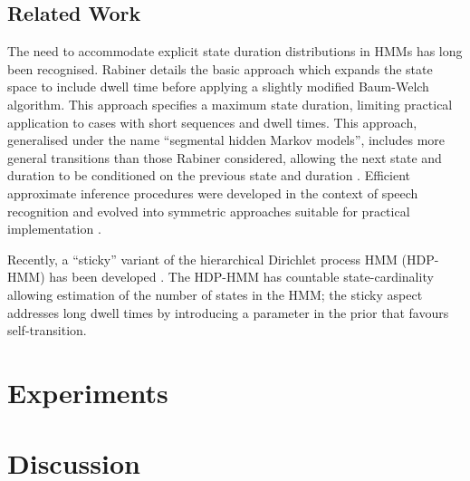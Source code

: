 \documentclass[journal]{../inc/oldtran/IEEEtran}
\begin{document}
\subsection{Related Work}

The need to accommodate explicit state duration distributions in HMMs has long been recognised. Rabiner \cite{Rabiner89} details the basic approach which expands the state space to include dwell time before applying a slightly modified Baum-Welch algorithm. This approach specifies a maximum state duration, limiting practical application 
to cases with short sequences and dwell times.
This approach, generalised under the name ``segmental hidden Markov models'', includes more general transitions than those Rabiner considered, allowing the next state and duration to be conditioned on the previous state and duration \cite{Gales93}. Efficient approximate inference procedures were developed in the context of speech recognition \cite{Ostendorf96} and evolved into symmetric approaches suitable for practical implementation \cite{Yu2006}.

Recently, a ``sticky'' variant of the hierarchical Dirichlet process HMM (HDP-HMM) has been developed \cite{Fox2008}.  The HDP-HMM has countable state-cardinality \cite{Teh06} allowing estimation of the number of states in the HMM; the sticky aspect addresses long dwell times by introducing a parameter in the prior that favours self-transition. 


\section{Experiments}

\label{sec:experiments}




\section{Discussion}

\label{sec:dicussion}






\end{document}
